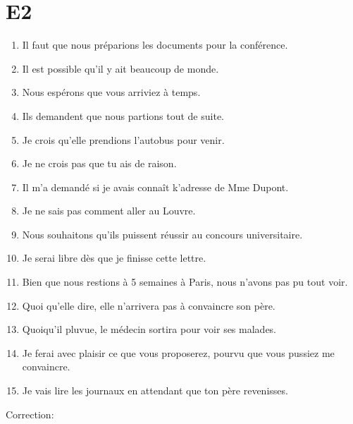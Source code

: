 \documentclass{book}
\begin{document}
    \section{E2}
        \begin{enumerate}
            \item Il faut que nous préparions les documents pour la conférence.
            \item Il est possible qu'il y ait beaucoup de monde.
            \item Nous espérons que vous arriviez à temps.
            \item Ils demandent que nous partions tout de suite.
            \item Je crois qu'elle prendions l'autobus pour venir.
            \item Je ne crois pas que tu ais de raison.
            \item Il m'a demandé si je avais connaît k'adresse de Mme Dupont.
            \item Je ne sais pas comment aller au Louvre.
            \item Nous souhaitons qu'ils puissent réussir au concours universitaire.
            \item Je serai libre dès que je finisse cette lettre.
            \item Bien que nous restions à 5 semaines à Paris, nous n'avons pas pu tout voir.
            \item Quoi qu'elle dire, elle n'arrivera pas à convaincre son père.
            \item Quoiqu'il pluvue, le médecin sortira pour voir ses malades.
            \item Je ferai avec plaisir ce que vous proposerez, pourvu que vous pussiez me convaincre.
            \item Je vais lire les journaux en attendant que ton père revenisses.
        \end{enumerate}
        Correction:
\end{document}
